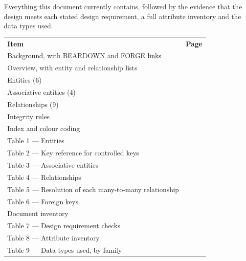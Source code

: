 \documentclass[11pt]{article}
\begin{document}
Everything this document currently contains, followed by the evidence that the design meets
each stated design requirement, a full attribute inventory and the data types used.

\begin{longtable}{|L{4.60in}|L{1.00in}|}
\hline
{} \\ \hline
{}\textbf{Item} & \textbf{Page} \\ \hline
Background, with BEARDOWN and FORGE links & \pageref{sec:bg} \\ \hline
Overview, with entity and relationship lists & \pageref{sec:ra} \\ \hline
Entities (6) & \pageref{sec:entities} \\ \hline
Associative entities (4) & \pageref{sec:assoc} \\ \hline
Relationships (9) & \pageref{sec:rels} \\ \hline
\quad Integrity rules & \pageref{sec:integ} \\ \hline
Index and colour coding & \pageref{sec:index} \\ \hline
\quad Table 1 --- Entities & \pageref{tab:ent} \\ \hline
\quad Table 2 --- Key reference for controlled keys & \pageref{tab:keys} \\ \hline
\quad Table 3 --- Associative entities & \pageref{tab:asc} \\ \hline
\quad Table 4 --- Relationships & \pageref{tab:rel} \\ \hline
\quad Table 5 --- Resolution of each many-to-many relationship & \pageref{tab:res} \\ \hline
\quad Table 6 --- Foreign keys & \pageref{tab:fk} \\ \hline
Document inventory & \pageref{sec:inv} \\ \hline
\quad Table 7 --- Design requirement checks & \pageref{tab:chk} \\ \hline
\quad Table 8 --- Attribute inventory & \pageref{tab:attr} \\ \hline
\quad Table 9 --- Data types used, by family & \pageref{tab:types} \\ \hline
\end{longtable}
\end{document}
